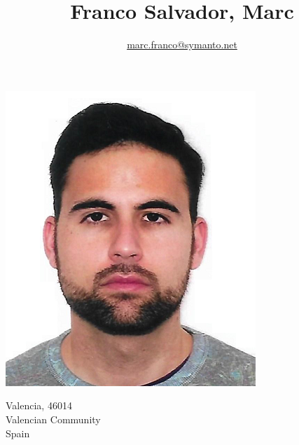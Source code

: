 \documentclass[10pt]{article}
\title{\bfseries\Huge Franco Salvador, Marc}
\author{\href{mailto:marc.franco@symanto.net}{marc.franco@symanto.net}}
\date{}
\begin{document}
\begin{minipage}{0.65\textwidth}
\begingroup
\let\center\flushleft
\let\endcenter\endflushleft
\maketitle
\endgroup
\end{minipage}
\begin{minipage}{0.3\textwidth}
\includegraphics[scale=0.3]{img/marc}
\end{minipage}

\begin{minipage}[ht]{0.48\textwidth}
Valencia, 46014\\
Valencian Community\\
Spain
\end{minipage}
\begin{minipage}[ht]{0.48\textwidth}

\end{minipage}

\vspace{2em}


\newcommand\VRule{\color{lightgray}\vrule width 0.5pt}
\end{document}
